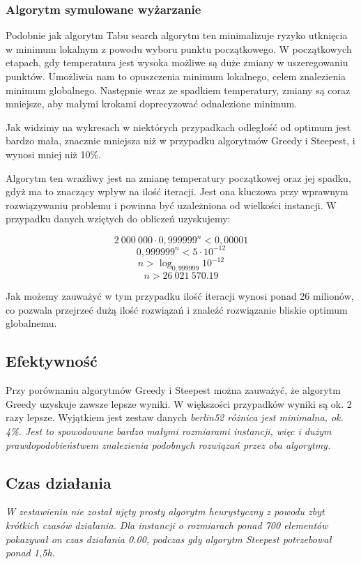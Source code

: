 \subsubsection{Algorytm symulowane wyżarzanie}

Podobnie jak algorytm Tabu search algorytm ten minimalizuje ryzyko utknięcia w minimum 
lokalnym z powodu wyboru punktu początkowego. W początkowych etapach, gdy temperatura jest 
wysoka możliwe są duże zmiany w uszeregowaniu punktów. Umożliwia nam to opuszczenia minimum
lokalnego, celem znalezienia minimum globalnego. Następnie wraz ze spadkiem temperatury, zmiany 
są coraz mniejsze, aby małymi krokami doprecyzować odnalezione minimum. 

Jak widzimy na wykresach w niektórych przypadkach odległość od optimum jest bardzo mała, znacznie 
mniejsza niż w przypadku algorytmów Greedy i Steepest, i wynosi mniej niż 10\%. 

Algorytm ten wrażliwy jest na zmianę temperatury początkowej oraz jej spadku, gdyż ma to znaczący 
wpływ na ilość iteracji. Jest ona kluczowa przy wprawnym rozwiązywaniu problemu i powinna być 
uzależniona od wielkości instancji. W przypadku danych wziętych do obliczeń uzyskujemy:

$$ 2~000~000 \cdot 0,999999^{n} < 0,00001 $$
$$ 0,999999^{n} < 5 \cdot 10^{-12} $$
$$ n > \log_{0,999999}10^{-12} $$
$$ n > 26~021~570.19 $$

Jak możemy zauważyć w tym przypadku ilość iteracji wynosi ponad 26 milionów, co pozwala przejrzeć 
dużą ilość rozwiązań i znaleźć rozwiązanie bliskie optimum globalnemu.


\subsection{Efektywność}

Przy porównaniu algorytmów Greedy i Steepest można zauważyć, że algorytm Greedy uzyskuje 
zawsze lepsze wyniki. W większości przypadków wyniki są ok. 2 razy lepsze. Wyjątkiem jest 
zestaw danych \it berlin52 \rm różnica jest minimalna, ok. 4\%. Jest to spowodowane 
bardzo małymi rozmiarami instancji, więc i dużym prawdopodobieństwem znalezienia podobnych
rozwiązań przez oba algorytmy.

\subsection{Czas działania}

\it
W zestawieniu nie został ujęty prosty algorytm heurystyczny z powodu zbyt krótkich czasów 
działania. Dla instancji o rozmiarach ponad 700 elementów pokazywał on czas działania 0.00, 
podczas gdy algorytm Steepest potrzebował ponad 1,5h.
\rm

